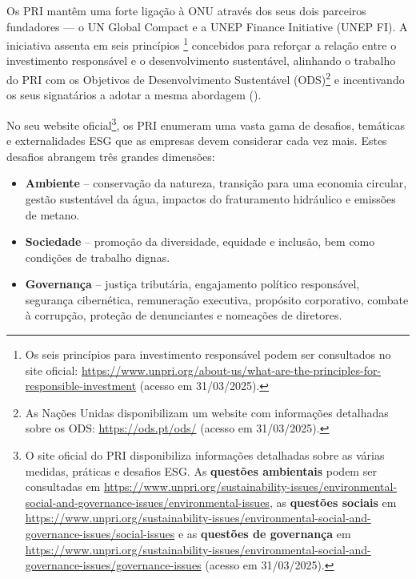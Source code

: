 Os PRI mantêm uma forte ligação à \gls{ONU} através dos seus dois parceiros fundadores — o UN Global Compact e a UNEP Finance Initiative (UNEP FI). A iniciativa assenta em seis princípios \footnote{Os seis princípios para investimento responsável podem ser consultados no site oficial: \url{https://www.unpri.org/about-us/what-are-the-principles-for-responsible-investment} (acesso em 31/03/2025).} concebidos para reforçar a relação entre o investimento responsável e o desenvolvimento sustentável, alinhando o trabalho do PRI com os Objetivos de Desenvolvimento Sustentável (ODS)\footnote{As Nações Unidas disponibilizam um website com informações detalhadas sobre os ODS: \url{https://ods.pt/ods/} (acesso em 31/03/2025).} e incentivando os seus signatários a adotar a mesma abordagem (\cite{PRIBlueprint2017}).

No seu website oficial\footnote{O site oficial do PRI disponibiliza informações detalhadas sobre as várias medidas, práticas e desafios ESG. As \textbf{questões ambientais} podem ser consultadas em \url{https://www.unpri.org/sustainability-issues/environmental-social-and-governance-issues/environmental-issues}, as \textbf{questões sociais} em \url{https://www.unpri.org/sustainability-issues/environmental-social-and-governance-issues/social-issues} e as \textbf{questões de governança} em \url{https://www.unpri.org/sustainability-issues/environmental-social-and-governance-issues/governance-issues} (acesso em 31/03/2025).}, os \gls{PRI} enumeram uma vasta gama de desafios, temáticas e externalidades ESG que as empresas devem considerar cada vez mais. Estes desafios abrangem três grandes dimensões:

\begin{itemize}
\item \textbf{Ambiente} – conservação da natureza, transição para uma economia circular, gestão sustentável da água, impactos do fraturamento hidráulico e emissões de metano.
\item \textbf{Sociedade} – promoção da diversidade, equidade e inclusão, bem como condições de trabalho dignas.
\item \textbf{Governança} – justiça tributária, engajamento político responsável, segurança cibernética, remuneração executiva, propósito corporativo, combate à corrupção, proteção de denunciantes e nomeações de diretores.
\end{itemize}


